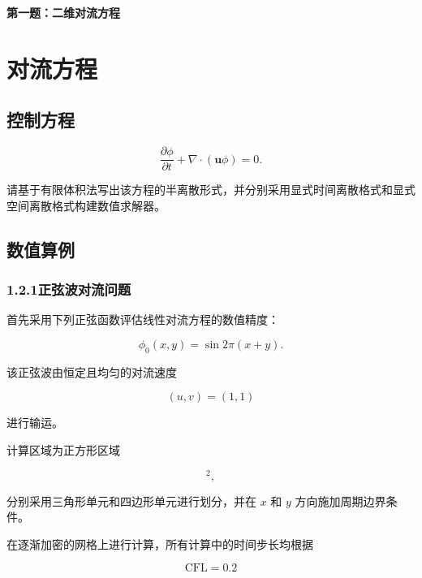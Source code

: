 \documentclass[UTF8,12pt,a4paper,fontset=fandol]{ctexart}
\begin{document}
\begin{center}
  {\LARGE\bfseries 第一题：二维对流方程}
\end{center}
\vspace{0.8em}

\section{对流方程}

\subsection{控制方程}

\begin{equation}
\frac{\partial\phi}{\partial t}
+\nabla\cdot(\bm{u}\phi)=0.
\end{equation}

请基于有限体积法写出该方程的半离散形式，并分别采用显式时间离散格式和显式空间离散格式构建数值求解器。

\subsection{数值算例}

\subsubsection{1.2.1\quad 正弦波对流问题}

首先采用下列正弦函数评估线性对流方程的数值精度：

\begin{equation}
\phi_0(x,y)=\sin 2\pi(x+y).
\end{equation}

该正弦波由恒定且均匀的对流速度

\begin{equation}
(u,v)=(1,1)
\end{equation}

进行输运。

计算区域为正方形区域

\begin{equation}
[0,1]^2,
\end{equation}

分别采用三角形单元和四边形单元进行划分，并在 $x$ 和 $y$ 方向施加周期边界条件。

在逐渐加密的网格上进行计算，所有计算中的时间步长均根据

\begin{equation}
\mathrm{CFL}=0.2
\end{equation}
\end{document}
